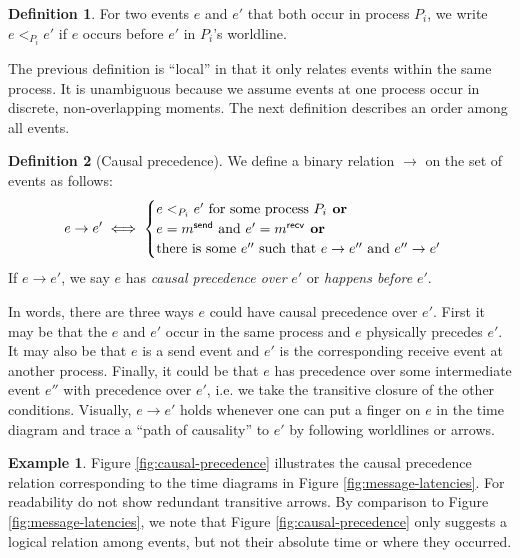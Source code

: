 \documentclass[]             %
{NASA}                       %
\theoremstyle{definition}
\newtheorem{example}{Example}[section]
\newtheorem{definition}{Definition}[section]
\begin{document}
\begin{definition}
  For two events $e$ and $e'$ that both occur in process $P_i$, we
  write $e <_{P_i} e'$ if $e$ occurs before $e'$ in $P_i$'s
  worldline.
\end{definition}
The previous definition is ``local'' in that it only relates events
within the same process. It is unambiguous because we assume events at
one process occur in discrete, non-overlapping moments. The next
definition describes an order among all events.

\begin{definition}[Causal precedence]
  \label{def:causalprecedence}
  We define a binary relation $\to$ on the set of events as follows:
  \[e \to e' \iff
  \begin{cases}
    e <_{P_i} e' \textrm{ for some process $P_i$}
    \textbf{ or} \\
    e = m_{}^{\mathsf{send}} \textrm{ and } e' =m_{}^{\mathsf{recv}}
    \textbf{ or} \\
    \textrm{there is some } e'' \textrm{ such that } e \to e'' \textrm{ and } e'' \to e'
  \end{cases}
  \]
  If $e \to e'$, we say $e$ has \emph{causal precedence over} $e'$ or
  \emph{happens before} $e'$.
\end{definition}

In words, there are three ways $e$ could have causal precedence over
$e'$.  First it may be that the $e$ and $e'$ occur in the same process
and $e$ physically precedes $e'$. It may also be that $e$ is a
send event and $e'$ is the corresponding receive event at another
process. Finally, it could be that $e$ has precedence over some
intermediate event $e''$ with precedence over $e'$, i.e. we take
the transitive closure of the other conditions. Visually, $e \to e'$
holds whenever one can put a finger on $e$ in the time diagram and
trace a ``path of causality'' to $e'$ by following worldlines or
arrows.

\begin{example}
  Figure \ref{fig:causal-precedence} illustrates the causal precedence
  relation corresponding to the time diagrams in Figure
  \ref{fig:message-latencies}. For readability do not show redundant
  transitive arrows. By comparison to Figure
  \ref{fig:message-latencies}, we note that Figure
  \ref{fig:causal-precedence} only suggests a logical relation among
  events, but not their absolute time or where they occurred.
\end{example}
\end{document}
